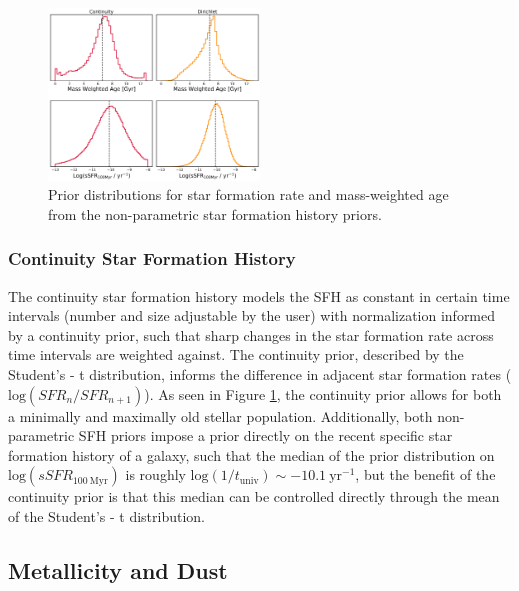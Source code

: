 \documentclass[twocolumn]{aastex62}
\begin{document}
\begin{figure}[h]

\centering
\includegraphics[width=0.5\textwidth]{nonpara_priors.png}\hfill

\caption{Prior distributions for star formation rate and mass-weighted age from the non-parametric star formation history priors.}
\label{fig:priors}

\end{figure}

\subsubsection{Continuity Star Formation History}

The continuity star formation history models the SFH as constant in certain time intervals (number and size adjustable by the user) with normalization informed by a continuity prior, such that sharp changes in the star formation rate across time intervals are weighted against. The continuity prior, described by the Student's - t distribution, informs the difference in adjacent star formation rates ($\mathrm{log}(SFR_n / SFR_{n+1})$). As seen in Figure \ref{fig:priors}, the continuity prior allows for both a minimally and maximally old stellar population. Additionally, both non-parametric SFH priors impose a prior directly on the recent specific star formation history of a galaxy, such that the median of the prior distribution on $\mathrm{log}(sSFR_{100 \: \mathrm{Myr}})$ is roughly $\mathrm{log}(1 / t_{\mathrm{univ}}) \sim -10.1 \: \mathrm{yr}^{-1}$, but the benefit of the continuity prior is that this median can be controlled directly through the mean of the Student's - t distribution.  



\subsection{Metallicity and Dust}
\end{document}
